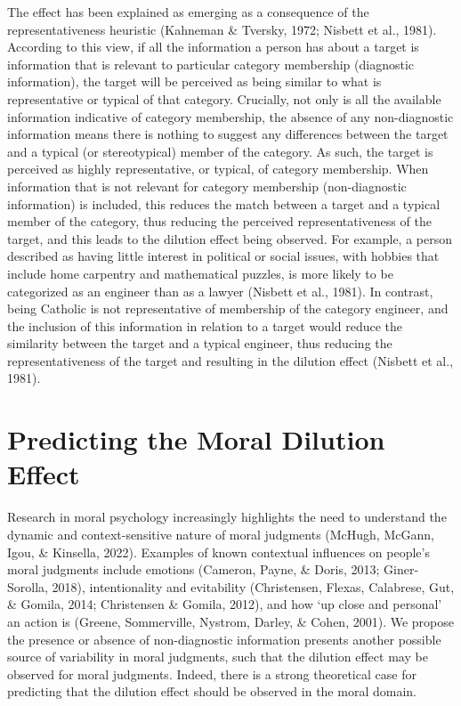 \documentclass[
  man,floatsintext]{apa7}
\begin{document}
The effect has been explained as emerging as a consequence of the representativeness heuristic (Kahneman \& Tversky, 1972; Nisbett et al., 1981). According to this view, if all the information a person has about a target is information that is relevant to particular category membership (diagnostic information), the target will be perceived as being similar to what is representative or typical of that category. Crucially, not only is all the available information indicative of category membership, the absence of any non-diagnostic information means there is nothing to suggest any differences between the target and a typical (or stereotypical) member of the category. As such, the target is perceived as highly representative, or typical, of category membership. When information that is not relevant for category membership (non-diagnostic information) is included, this reduces the match between a target and a typical member of the category, thus reducing the perceived representativeness of the target, and this leads to the dilution effect being observed. For example, a person described as having little interest in political or social issues, with hobbies that include home carpentry and mathematical puzzles, is more likely to be categorized as an engineer than as a lawyer (Nisbett et al., 1981). In contrast, being Catholic is not representative of membership of the category engineer, and the inclusion of this information in relation to a target would reduce the similarity between the target and a typical engineer, thus reducing the representativeness of the target and resulting in the dilution effect (Nisbett et al., 1981).

\section{Predicting the Moral Dilution Effect}\label{predicting-the-moral-dilution-effect}

Research in moral psychology increasingly highlights the need to understand the dynamic and context-sensitive nature of moral judgments (McHugh, McGann, Igou, \& Kinsella, 2022). Examples of known contextual influences on people's moral judgments include emotions (Cameron, Payne, \& Doris, 2013; Giner-Sorolla, 2018), intentionality and evitability (Christensen, Flexas, Calabrese, Gut, \& Gomila, 2014; Christensen \& Gomila, 2012), and how `up close and personal' an action is (Greene, Sommerville, Nystrom, Darley, \& Cohen, 2001). We propose the presence or absence of non-diagnostic information presents another possible source of variability in moral judgments, such that the dilution effect may be observed for moral judgments. Indeed, there is a strong theoretical case for predicting that the dilution effect should be observed in the moral domain.
\end{document}
